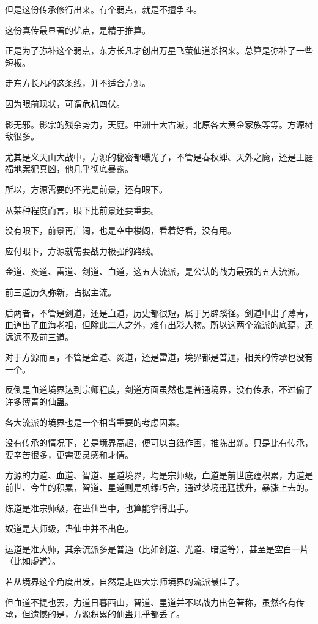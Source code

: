 \begin{this_body}
但是这份传承修行出来。有个弱点，就是不擅争斗。

这份真传最显著的优点，是精于推算。

正是为了弥补这个弱点，东方长凡才创出万星飞萤仙道杀招来。总算是弥补了一些短板。

走东方长凡的这条线，并不适合方源。

因为眼前现状，可谓危机四伏。

影无邪。影宗的残余势力，天庭。中洲十大古派，北原各大黄金家族等等。方源树敌很多。

尤其是义天山大战中，方源的秘密都曝光了，不管是春秋蝉、天外之魔，还是王庭福地案犯真凶，他几乎彻底暴露。

所以，方源需要的不光是前景，还有眼下。

从某种程度而言，眼下比前景还要重要。

没有眼下，前景再广阔，也是空中楼阁，看着好看，没有用。

应付眼下，方源就需要战力极强的路线。

金道、炎道、雷道、剑道、血道，这五大流派，是公认的战力最强的五大流派。

前三道历久弥新，占据主流。

后两者，不管是剑道，还是血道，历史都很短，属于另辟蹊径。剑道中出了薄青，血道出了血海老祖，但除此二人之外，难有出彩人物。所以这两个流派的底蕴，还远远不及前三道。

对于方源而言，不管是金道、炎道，还是雷道，境界都是普通，相关的传承也没有一个。

反倒是血道境界达到宗师程度，剑道方面虽然也是普通境界，没有传承，不过偷了许多薄青的仙蛊。

各大流派的境界也是一个相当重要的考虑因素。

没有传承的情况下，若是境界高超，便可以白纸作画，推陈出新。只是比有传承，要辛苦很多，更需要灵感和才情。

方源的力道、血道、智道、星道境界，均是宗师级，血道是前世底蕴积累，力道是前世、今生的积累，智道、星道则是机缘巧合，通过梦境迅猛拔升，暴涨上去的。

炼道是准宗师级，在蛊仙当中，也算能拿得出手。

奴道是大师级，蛊仙中并不出色。

运道是准大师，其余流派多是普通（比如剑道、光道、暗道等），甚至是空白一片（比如虚道）。

若从境界这个角度出发，自然是走四大宗师境界的流派最佳了。

但血道不提也罢，力道日暮西山，智道、星道并不以战力出色著称，虽然各有传承，但遗憾的是，方源积累的仙蛊几乎都丢了。


\end{this_body}
